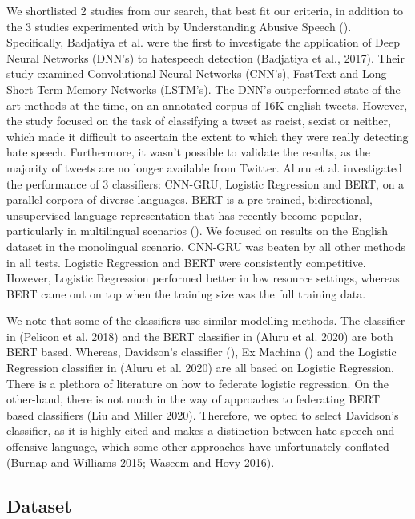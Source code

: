 \documentclass[letterpaper]{article} %
\begin{document}
We shortlisted 2 studies from our search, that best fit our criteria, in addition to the 3 studies experimented with by Understanding Abusive Speech (). Specifically, Badjatiya et al. were the first to investigate the application of Deep Neural Networks (DNN's) to  hatespeech detection (Badjatiya et al., 2017). Their study examined Convolutional Neural Networks (CNN's), FastText and Long Short-Term Memory Networks (LSTM's). The DNN's outperformed state of the art methods at the time, on an annotated corpus of 16K english tweets. However, the study focused on the task of classifying a tweet as racist, sexist or neither, which made it difficult to ascertain the extent to which they were really detecting hate speech. Furthermore, it wasn't possible to validate the results, as the majority of tweets are no longer available from Twitter. Aluru et al. investigated the performance of 3 classifiers: CNN-GRU, Logistic Regression and BERT, on a parallel corpora of diverse languages. BERT is a pre-trained, bidirectional, unsupervised language representation  that has recently become popular, particularly in multilingual scenarios (). We focused on results on the English dataset in the monolingual scenario. CNN-GRU was beaten by all other methods in all tests. Logistic Regression and BERT were consistently competitive. However, Logistic Regression performed better in low resource settings, whereas BERT came out on top when the training size was the full training data.

We note that some of the classifiers use similar modelling methods. The classifier in (Pelicon et al. 2018) and the BERT classifier in (Aluru et al. 2020) are both BERT based. Whereas, Davidson's classifier (), Ex Machina () and the Logistic Regression classifier in (Aluru et al. 2020) are all based on Logistic Regression. There is a plethora of literature on how to federate logistic regression. On the other-hand, there is not much in the way of approaches to federating BERT based classifiers (Liu and Miller 2020). Therefore, we opted to select Davidson's classifier, as it is highly cited and makes a distinction between hate speech and offensive language, which some other approaches have unfortunately conflated (Burnap and Williams 2015; Waseem and Hovy 2016). 

\subsection{Dataset}
\end{document}
